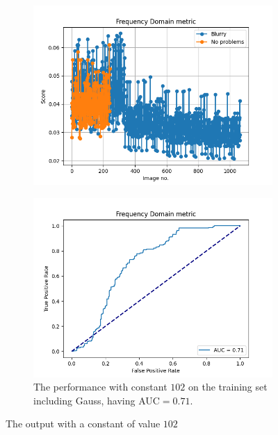 \begin{figure}[H]
    \begin{subfigure}[t]{0.48\textwidth}
        \includegraphics[width=\textwidth]{Figures/tweakFM/102_output_basic.png}
        \caption{}
        \label{fig:FM_basic_gauss_102}
    \end{subfigure}\hspace{1em}
    \begin{subfigure}[t]{0.48\textwidth}
        \includegraphics[width=\textwidth]{Figures/tweakFM/102_output_roc.png}
        \caption{The performance with constant $102$ on the training set including Gauss, having AUC$=0.71$.}
        \label{fig:FM_roc_gauss_102}
    \end{subfigure}
    \caption{The output with a constant of value $102$}
\end{figure}

